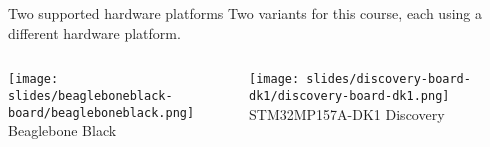 \begin{frame}{Two supported hardware platforms}
  Two variants for this course, each using a different hardware
  platform.  \vfill
  \begin{columns}
    \begin{center}
      \texttt{[image: slides/beagleboneblack-board/beagleboneblack.png]}
      \newline
      Beaglebone Black
    \end{center}
    \begin{center}
      \texttt{[image: slides/discovery-board-dk1/discovery-board-dk1.png]}
      \newline
      STM32MP157A-DK1 Discovery
    \end{center}
  \end{columns}
\end{frame}


